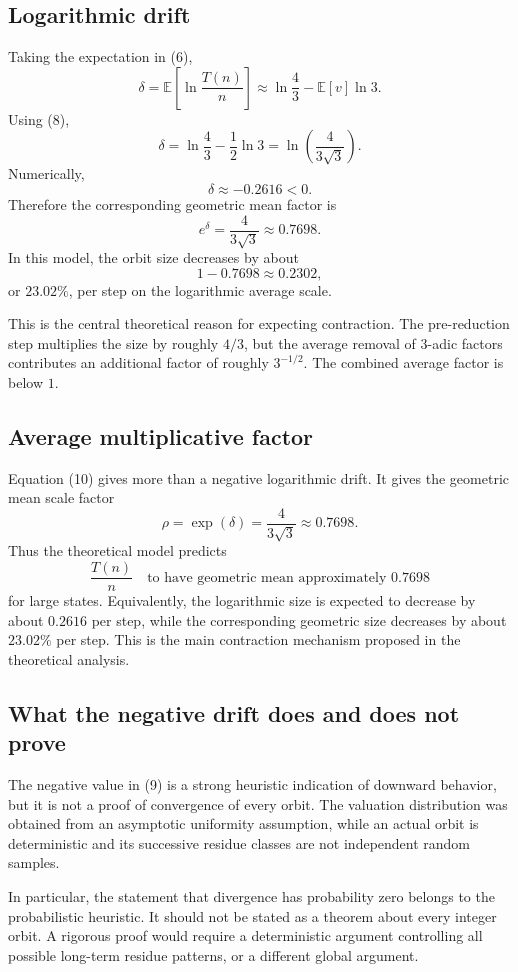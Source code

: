 \documentclass[11pt]{article}
\begin{document}
\subsection{Logarithmic drift}
Taking the expectation in (6),
\[
\delta
=\mathbb E\left[\ln\frac{T(n)}n\right]
\approx \ln\frac43-\mathbb E[v]\ln3.
\]
Using (8),
\[
\boxed{\delta=\ln\frac43-\frac12\ln3
=\ln\left(\frac4{3\sqrt3}\right)}.
\tag{9}
\]
Numerically,
\[
\delta\approx-0.2616<0.
\]
Therefore the corresponding geometric mean factor is
\[
e^\delta=\frac4{3\sqrt3}\approx0.7698.
\tag{10}
\]
In this model, the orbit size decreases by about
\[
1-0.7698\approx0.2302,
\]
or $23.02\%$, per step on the logarithmic average scale.

This is the central theoretical reason for expecting contraction. The pre-reduction step multiplies the size by roughly $4/3$, but the average removal of $3$-adic factors contributes an additional factor of roughly $3^{-1/2}$. The combined average factor is below $1$.

\subsection{Average multiplicative factor}
Equation (10) gives more than a negative logarithmic drift. It gives the geometric mean scale factor
\[
\rho=\exp(\delta)=\frac{4}{3\sqrt3}\approx0.7698.
\tag{14}
\]
Thus the theoretical model predicts
\[
\frac{T(n)}{n}\quad\text{to have geometric mean approximately }0.7698
\]
for large states. Equivalently, the logarithmic size is expected to decrease by about $0.2616$ per step, while the corresponding geometric size decreases by about $23.02\%$ per step. This is the main contraction mechanism proposed in the theoretical analysis.

\subsection{What the negative drift does and does not prove}
The negative value in (9) is a strong heuristic indication of downward behavior, but it is not a proof of convergence of every orbit. The valuation distribution was obtained from an asymptotic uniformity assumption, while an actual orbit is deterministic and its successive residue classes are not independent random samples.

In particular, the statement that divergence has probability zero belongs to the probabilistic heuristic. It should not be stated as a theorem about every integer orbit. A rigorous proof would require a deterministic argument controlling all possible long-term residue patterns, or a different global argument.
\end{document}
